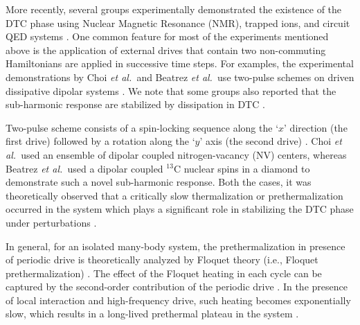 \documentclass[prl,aps,twocolumn,floatfix]{revtex4-1}
\newcommand{\etal}{\textit{et al.\ }}
\begin{document}
More recently, several groups experimentally demonstrated the existence of the DTC phase using Nuclear Magnetic 
Resonance (NMR), trapped ions, and circuit QED
systems \cite{zhang_observation_2017, choi_observation_2017, rovny_observation_2018,
pal_temporal_2018, kyprianidis_observation_2021, beatrez_critical_2023, kesler_observation_2021, gong_discrete_2018, 
taheri_all-optical_2022}.  One common feature for most of the
experiments mentioned above is the application of external drives that contain two non-commuting
Hamiltonians are applied in successive time steps. For examples, 
the experimental demonstrations by Choi \etal and Beatrez \etal use two-pulse schemes on driven dissipative dipolar systems
\cite{choi_observation_2017, beatrez_critical_2023}. 
We note that some groups also reported that the sub-harmonic
response are stabilized by dissipation in DTC \cite{kesler_observation_2021, gong_discrete_2018, taheri_all-optical_2022}.  


Two-pulse scheme consists of a spin-locking sequence along the `$x$' direction (the first drive) followed by a rotation along the `$y$'
axis (the second drive) \cite{choi_observation_2017, beatrez_critical_2023}.
Choi \etal used an ensemble of dipolar
coupled nitrogen-vacancy (NV) centers, whereas  Beatrez \etal used a dipolar coupled $^{13}$C nuclear spins in a diamond to demonstrate such a novel sub-harmonic response. Both the cases, it was theoretically observed that a critically slow thermalization or prethermalization occurred in the system  which plays a significant role in stabilizing the DTC phase under
perturbations \cite{ho_critical_2017, beatrez_floquet_2021}. 

In general, for an isolated many-body system, the prethermalization in presence of periodic drive is
theoretically analyzed by Floquet theory (i.e., Floquet prethermalization) \cite{beatrez_floquet_2021,
kuwahara_floquetmagnus_2016, bukov_prethermal_2015, rubio-abadal_floquet_2020, yin_prethermal_2021,
holthaus_floquet_2016}. The effect of the Floquet heating in each cycle can be captured by the second-order
contribution of the periodic drive \cite{rubio-abadal_floquet_2020}. In the presence of local interaction
and high-frequency drive, such heating becomes exponentially slow, which results in a long-lived prethermal
plateau in the system \cite{Abanin2015}.  
\end{document}
